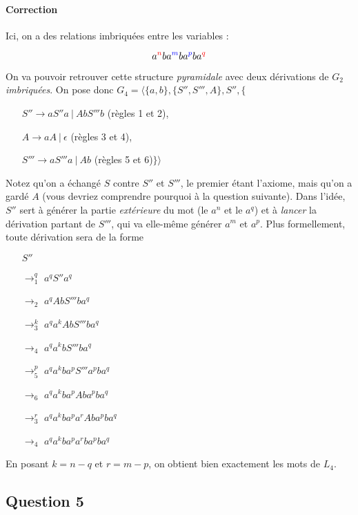 \documentclass{article}[11pt]
\theoremstyle{definition}
\begin{document}
\paragraph*{Correction} Ici, on a des relations imbriquées entre les variables : 

\[
a^{\textcolor{red}{n}}ba^{\textcolor{blue}{m}}ba^{\textcolor{blue}{p}}ba^{\textcolor{red}{q}}
\]

\noindent
On va pouvoir retrouver cette structure \textit{pyramidale} avec deux dérivations de $G_2$ \textit{imbriquées}. On pose donc $G_4 = \big \langle \{a,b\}, \{S'',S''',A\},S'',\{$

\begin{itemize}
\item[] $S'' \rightarrow aS''a~|~AbS'''b$ (règles 1 et 2),
\item[] $A \rightarrow aA~|~\epsilon $ (règles 3 et 4),
\item[] $S''' \rightarrow aS'''a~|~Ab$ (règles 5 et 6)$\}\big \rangle$ 
\end{itemize}

\noindent
Notez qu'on a échangé $S$ contre $S''$ et $S'''$, le premier étant l'axiome, mais qu'on a gardé $A$ (vous devriez comprendre pourquoi à la question suivante). Dans l'idée, $S''$ sert à générer la partie \textit{extérieure} du mot (le $a^n$ et le $a^q$) et à \textit{lancer} la dérivation partant de $S'''$, qui va elle-même générer $a^m$ et $a^p$. Plus formellement, toute dérivation sera de la forme 

\begin{itemize}
\item[] $S''$
\item[$\rightarrow_1^q$] $a^qS''a^q $
\item[$\rightarrow_2$] $a^qAbS'''ba^q$
\item[$\rightarrow_3^k$] $a^qa^kAbS'''ba^q$
\item[$\rightarrow_4$] $a^qa^kbS'''ba^q$
\item[$\rightarrow^p_5$] $a^qa^kba^pS'''a^pba^q$
\item[$\rightarrow_6$] $a^qa^kba^pAba^pba^q$
\item[$\rightarrow_3^r$] $a^qa^kba^pa^rAba^pba^q$
\item[$\rightarrow_4$] $a^qa^kba^pa^rba^pba^q$
\end{itemize}
       

\noindent
En posant $k = n-q$ et $r = m-p$, on obtient bien exactement les mots de $L_4$.

\subsection*{Question 5}
\end{document}
